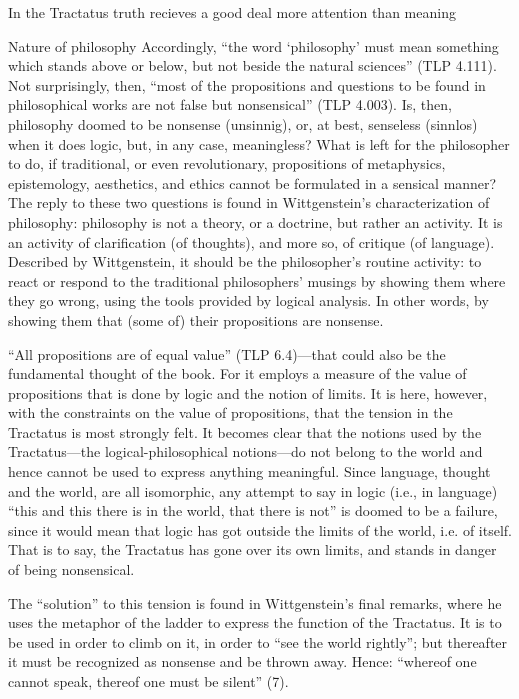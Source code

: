 \documentclass[../main.tex]{subfiles}
\begin{document}
In the Tractatus truth recieves a good deal more attention than meaning

Nature of philosophy
Accordingly, “the word ‘philosophy’ must mean something which stands above or below, but not beside the natural sciences” (TLP 4.111). Not surprisingly, then, “most of the propositions and questions to be found in philosophical works are not false but nonsensical” (TLP 4.003). Is, then, philosophy doomed to be nonsense (unsinnig), or, at best, senseless (sinnlos) when it does logic, but, in any case, meaningless? What is left for the philosopher to do, if traditional, or even revolutionary, propositions of metaphysics, epistemology, aesthetics, and ethics cannot be formulated in a sensical manner? The reply to these two questions is found in Wittgenstein's characterization of philosophy: philosophy is not a theory, or a doctrine, but rather an activity. It is an activity of clarification (of thoughts), and more so, of critique (of language). Described by Wittgenstein, it should be the philosopher's routine activity: to react or respond to the traditional philosophers' musings by showing them where they go wrong, using the tools provided by logical analysis. In other words, by showing them that (some of) their propositions are nonsense.

“All propositions are of equal value” (TLP 6.4)—that could also be the fundamental thought of the book. For it employs a measure of the value of propositions that is done by logic and the notion of limits. It is here, however, with the constraints on the value of propositions, that the tension in the Tractatus is most strongly felt. It becomes clear that the notions used by the Tractatus—the logical-philosophical notions—do not belong to the world and hence cannot be used to express anything meaningful. Since language, thought and the world, are all isomorphic, any attempt to say in logic (i.e., in language) “this and this there is in the world, that there is not” is doomed to be a failure, since it would mean that logic has got outside the limits of the world, i.e. of itself. That is to say, the Tractatus has gone over its own limits, and stands in danger of being nonsensical.

The “solution” to this tension is found in Wittgenstein's final remarks, where he uses the metaphor of the ladder to express the function of the Tractatus. It is to be used in order to climb on it, in order to “see the world rightly”; but thereafter it must be recognized as nonsense and be thrown away. Hence: “whereof one cannot speak, thereof one must be silent” (7).
\end{document}
